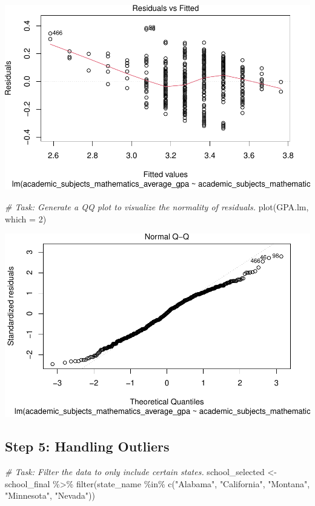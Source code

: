 \documentclass[
]{book}
\newenvironment{Shaded}{\begin{snugshade}}{\end{snugshade}}
\newcommand{\AttributeTok}[1]{\textcolor[rgb]{0.77,0.63,0.00}{#1}}
\newcommand{\CommentTok}[1]{\textcolor[rgb]{0.56,0.35,0.01}{\textit{#1}}}
\newcommand{\DecValTok}[1]{\textcolor[rgb]{0.00,0.00,0.81}{#1}}
\newcommand{\FunctionTok}[1]{\textcolor[rgb]{0.00,0.00,0.00}{#1}}
\newcommand{\NormalTok}[1]{#1}
\newcommand{\OtherTok}[1]{\textcolor[rgb]{0.56,0.35,0.01}{#1}}
\newcommand{\SpecialCharTok}[1]{\textcolor[rgb]{0.00,0.00,0.00}{#1}}
\newcommand{\StringTok}[1]{\textcolor[rgb]{0.31,0.60,0.02}{#1}}
\begin{document}
\includegraphics[width=1\linewidth]{Class_Activity_25_files/figure-latex/unnamed-chunk-11-1}

\begin{Shaded}
\begin{Highlighting}[]
\CommentTok{\# Task: Generate a QQ plot to visualize the normality of residuals.}
\FunctionTok{plot}\NormalTok{(GPA.lm, }\AttributeTok{which =} \DecValTok{2}\NormalTok{)}
\end{Highlighting}
\end{Shaded}

\includegraphics[width=1\linewidth]{Class_Activity_25_files/figure-latex/unnamed-chunk-12-1}

\hypertarget{step-5-handling-outliers}{%
\subsection{Step 5: Handling Outliers}\label{step-5-handling-outliers}}

\begin{Shaded}
\begin{Highlighting}[]
\CommentTok{\# Task: Filter the data to only include certain states.}
\NormalTok{school\_selected }\OtherTok{\textless{}{-}}\NormalTok{ school\_final }\SpecialCharTok{\%\textgreater{}\%} 
  \FunctionTok{filter}\NormalTok{(state\_name }\SpecialCharTok{\%in\%} \FunctionTok{c}\NormalTok{(}\StringTok{"Alabama"}\NormalTok{, }\StringTok{"California"}\NormalTok{, }\StringTok{"Montana"}\NormalTok{, }\StringTok{"Minnesota"}\NormalTok{, }\StringTok{"Nevada"}\NormalTok{))}
\end{Highlighting}
\end{Shaded}
\end{document}
